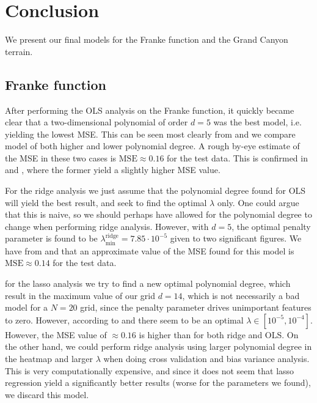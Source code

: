 \section{Conclusion}\label{sec:conclusion}


We present our final models for the Franke function and the Grand Canyon terrain. 


\subsection{Franke function}
 
After performing the OLS analysis on the Franke function, it quickly became clear that a two-dimensional polynomial of order $d=5$ was the best model, i.e. yielding the lowest MSE. This can be seen most clearly from  and  we compare model of both higher and lower polynomial degree. A rough by-eye estimate of the MSE in these two cases is $\mathrm{MSE}\approx 0.16$ for the test data. This is confirmed in  and , where the former yield a slightly higher MSE value. 

For the ridge analysis we just assume that the polynomial degree found for OLS will yield the best result, and seek to find the optimal $\lambda$ only. One could argue that this is naive, so we should perhaps have allowed for the polynomial degree to change when performing ridge analysis. However, with $d=5$, the optimal penalty parameter is found to be $\lambda_\mathrm{min}^\mathrm{ridge} = 7.85\cdot10^{-5}$ given to two significant figures. We have from  and  that an approximate value of the MSE found for this model is $\mathrm{MSE} \approx 0.14$ for the test data. 

for the lasso analysis we try to find a new optimal polynomial degree, which result in the maximum value of our grid $d=14$, which is not necessarily a bad model for a $N=20$ grid, since the penalty parameter drives unimportant features to zero. However, according to  and  there seem to be an optimal $\lambda\in[10^{-5}, 10^{-4}]$. However, the MSE value of $\approx 0.16$ is higher than for both ridge and OLS. On the other hand, we could perform ridge analysis using larger polynomial degree in the heatmap and larger $\lambda$ when doing cross validation and bias variance analysis. This is very computationally expensive, and since it does not seem that lasso regression yield a significantly better results (worse for the parameters we found), we discard this model. 

